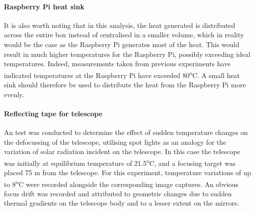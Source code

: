 \paragraph{Raspberry Pi heat sink}

It is also worth noting that in this analysis, the heat generated is distributed across the entire box instead of centralised in a smaller volume, which in reality would be the case as the Raspberry Pi generates most of the heat. This would result in much higher temperatures for the Raspberry Pi, possibly exceeding ideal temperatures. Indeed, measurements taken from previous experiments have indicated temperatures at the Raspberry Pi have exceeded 80\textsuperscript{o}C. A small heat sink should therefore be used to distribute the heat from the Raspberry Pi more evenly.\\ 

\paragraph{Reflecting tape for telescope}
An test was conducted to determine the effect of sudden temperature changes on the defocussing of the telescope, utilising spot lights as an analogy for the variation of solar radiation incident on the telescope. In this case the telescope was initially at equilibrium temperature of 21.5\textsuperscript{o}C, and a focusing target was placed 75 m from the telescope. For this experiment, temperature variations of up to 8\textsuperscript{o}C were recorded alongside the corresponding image captures. An obvious focus drift was recorded and attributed to geometric changes due to sudden thermal gradients on the telescope body and to a lesser extent on the mirrors.


